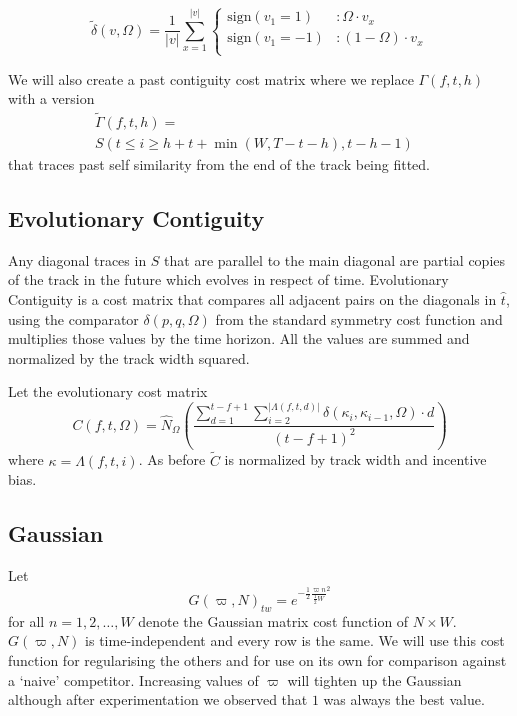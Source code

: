 \documentclass[twocolumn]{article}
\begin{document}
\begin{dmath*}\tilde \delta( v, \Omega ) = \frac{1}{|v|} \sum^{|v|}_{x=1}
		\left\{ 
		\begin{array}{lr}
		   \mathrm{sign}(v_1=1) &:  \Omega \cdot v_x \\
		   \mathrm{sign}(v_1=-1) &: (1-\Omega) \cdot v_x  \\
		\end{array}
		\right.
\end{dmath*}	
	
	We will also create a past contiguity cost matrix where we replace $\Gamma( f,t,h )$ with a version 
\begin{dmath*}
	\begin{array}{ll}
	\tilde \Gamma( f,t,h ) =& \\
	 S( t \le i \ge h+t+\min(W,T-t-h),  t-h-1  )
	\end{array}
\end{dmath*}
	that traces past self similarity from the end of the track being fitted.
	
	\subsection{Evolutionary Contiguity}
	
	Any diagonal traces in $S$ that are parallel to the main diagonal are partial copies of the track in the future which evolves in respect of time. Evolutionary Contiguity is a cost matrix that compares all adjacent pairs on the diagonals in $\hat t$, using the comparator $\delta( p,q, \Omega )$ from the standard symmetry cost function and multiplies those values by the time horizon. All the values are summed and normalized by the track width squared. 
	
	Let the evolutionary cost matrix
	\begin{dmath*} C(f, t, \Omega) =  
		\hat N_\Omega\left(\frac{
		\sum_{d=1}^{t-f+1} 
		\sum_{i=2}^{|\Lambda( f,t,d )|}  \delta( \kappa_{i}, \kappa_{i-1}, \Omega ) \cdot d
	}{(t-f+1)^2}\right)
	\end{dmath*}  where  $\kappa=\Lambda( f,t,i )$. As before $\tilde C$ is normalized by track width and incentive bias.
	
	
	
	
	\subsection{Gaussian}
	Let \[
	G( \varpi, N )_{tw} = e^{ - \frac{1}{2} \frac{\varpi n}{ \frac{1}{2} W}^2  }
	\] for all $n=1,2,\ldots,W$ denote the Gaussian matrix cost function of $N\times W$. $G( \varpi, N )$ is time-independent and every row is the same. We will use this cost function for regularising the others and for use on its own for comparison against a `naive' competitor. Increasing values of $\varpi$ will tighten up the Gaussian although after experimentation we observed that $1$ was always the best value.
	
\end{document}

